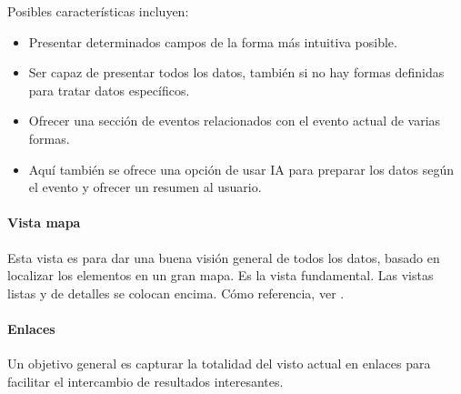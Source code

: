 Posibles características incluyen:
\begin{itemize}
    \item[Especificidad] Presentar determinados campos de la forma más intuitiva posible.
    \item[Flexibilidad] Ser capaz de presentar todos los datos, también si no hay formas definidas para tratar datos específicos.
    \item[Eventos similares] Ofrecer una sección de eventos relacionados con el evento actual de varias formas.
    \item[IA] Aquí también se ofrece una opción de usar IA para preparar los datos según el evento y ofrecer un resumen al usuario.
\end{itemize}

\paragraph{Vista mapa} Esta vista es para dar una buena visión general de todos los datos, basado en localizar los elementos en un gran mapa. Es la vista fundamental. Las vistas listas y de detalles se colocan encima.
Cómo referencia, ver .


\paragraph{Enlaces} Un objetivo general es capturar la totalidad del visto actual en enlaces para facilitar el intercambio de resultados interesantes.